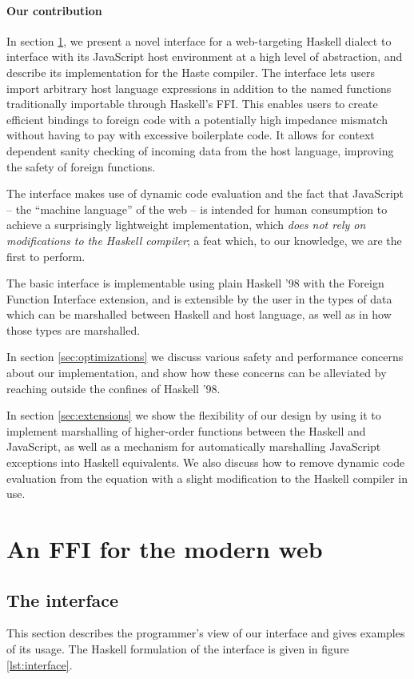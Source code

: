 \documentclass[preprint]{sigplanconf}
\begin{document}
\paragraph{Our contribution}\label{sec:contrib}
In section \ref{sec:interface}, we present a novel interface for a web-targeting
Haskell dialect to interface with its JavaScript host environment at a high level of
abstraction, and describe its implementation for the Haste compiler.
The interface lets users import arbitrary host language expressions in addition
to the named functions traditionally importable through Haskell's FFI.
This enables users to create efficient bindings to foreign code with a potentially
high impedance mismatch without having to pay with excessive boilerplate code.
It allows for context dependent sanity checking of incoming data from the host
language, improving the safety of foreign functions.

The interface makes use of dynamic code evaluation and the fact that
JavaScript -- the ``machine language'' of the web -- is intended for human
consumption to achieve a surprisingly lightweight implementation, which
\emph{does not rely on modifications to the Haskell compiler}; a feat which,
to our knowledge, we are the first to perform.

The basic interface is implementable using plain Haskell '98 with the
Foreign Function Interface extension, and is extensible by the user in the
types of data which can be marshalled between Haskell and host language,
as well as in how those types are marshalled.

In section \ref{sec:optimizations} we discuss various safety and performance
concerns about our implementation, and show how these concerns can be
alleviated by reaching outside the confines of Haskell '98.

In section \ref{sec:extensions} we show the flexibility of our design by using
it to implement marshalling of higher-order functions between the Haskell and
JavaScript, as well as a mechanism for automatically marshalling JavaScript
exceptions into Haskell equivalents.
We also discuss how to remove dynamic code evaluation from the equation
with a slight modification to the Haskell compiler in use.

\section{An FFI for the modern web}\label{sec:interface}
\subsection{The interface}
This section describes the programmer's view of our interface and gives
examples of its usage.
The Haskell formulation of the interface is given in figure \ref{lst:interface}.
\end{document}
